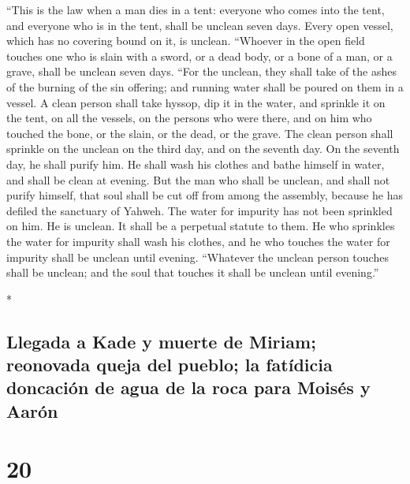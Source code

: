 \begin{paracol}{2}
\begin{otherlanguage}{english}
 ``This is the law when a man dies in a tent: everyone
who comes into the tent, and everyone who is in the tent, shall be
unclean seven days.  Every open vessel, which has no
covering bound on it, is unclean.  ``Whoever in the open
field touches one who is slain with a sword, or a dead body, or a bone
of a man, or a grave, shall be unclean seven days.  ``For
the unclean, they shall take of the ashes of the burning of the sin
offering; and running water shall be poured on them in a vessel.
 A clean person shall take hyssop, dip it in the water,
and sprinkle it on the tent, on all the vessels, on the persons who were
there, and on him who touched the bone, or the slain, or the dead, or
the grave.  The clean person shall sprinkle on the
unclean on the third day, and on the seventh day. On the seventh day, he
shall purify him. He shall wash his clothes and bathe himself in water,
and shall be clean at evening.  But the man who shall be
unclean, and shall not purify himself, that soul shall be cut off from
among the assembly, because he has defiled the sanctuary of Yahweh. The
water for impurity has not been sprinkled on him. He is unclean.
 It shall be a perpetual statute to them. He who
sprinkles the water for impurity shall wash his clothes, and he who
touches the water for impurity shall be unclean until evening.
 ``Whatever the unclean person touches shall be unclean;
and the soul that touches it shall be unclean until evening.''

\end{otherlanguage}

\switchcolumn[0]*

\hypertarget{llegada-a-kade-y-muerte-de-miriam-reonovada-queja-del-pueblo-la-fatuxeddicia-doncaciuxf3n-de-agua-de-la-roca-para-moisuxe9s-y-aaruxf3n}{%
\subsection{Llegada a Kade y muerte de Miriam; reonovada queja del
pueblo; la fatídicia doncación de agua de la roca para Moisés y
Aarón}\label{llegada-a-kade-y-muerte-de-miriam-reonovada-queja-del-pueblo-la-fatuxeddicia-doncaciuxf3n-de-agua-de-la-roca-para-moisuxe9s-y-aaruxf3n}}

\hypertarget{section-38}{%
\section{20}\label{section-38}}


\end{paracol}
